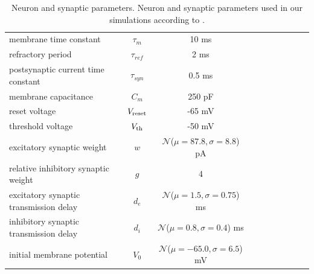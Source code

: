 \documentclass[10pt,a4paper,onecolumn]{article}
\begin{document}
\begin{table}[!ht]
  \caption{\label{table:parameters} Neuron and synaptic parameters. Neuron and synaptic parameters used in our simulations according to \cite{potjans2014}.}
 \begin{center}
  \begin{tabular}{lccccccccc}
   \toprule
   \midrule
 membrane time constant & $\tau_m$ & 10 ms \tabularnewline
 refractory period & $\tau_{ref}$ & 2 ms \tabularnewline
 postsynaptic current time constant & $\tau_{syn}$ & 0.5 ms \tabularnewline
 membrane capacitance & $C_m$ & 250 pF\tabularnewline
 reset voltage & $V_{\rm reset}$ & -65 mV\tabularnewline
 threshold voltage & $V_{\rm th}$ & -50 mV\tabularnewline
 excitatory synaptic weight & $w$ & $\mathcal{N}$($\mu = 87.8, \sigma = 8.8$) pA \tabularnewline
 relative inhibitory synaptic weight & $g$ & 4 \tabularnewline
 excitatory synaptic transmission delay & $d_e$ & $\mathcal{N}$($\mu=1.5 , \sigma = 0.75$) ms \tabularnewline
 inhibitory synaptic transmission delay & $d_i$ & $\mathcal{N}$($\mu = 0.8 , \sigma = 0.4$) ms \tabularnewline
 initial membrane potential & $V_0$ & $\mathcal{N}$($\mu=-65.0, \sigma=6.5$) mV \tabularnewline
   \bottomrule
  \end{tabular}
 \end{center}
\end{table}
\end{document}
